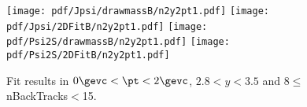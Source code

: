 \begin{figure}[H]
\begin{center}
\texttt{[image: pdf/Jpsi/drawmassB/n2y2pt1.pdf]}
\texttt{[image: pdf/Jpsi/2DFitB/n2y2pt1.pdf]}
\vspace*{-0.5cm}
\texttt{[image: pdf/Psi2S/drawmassB/n2y2pt1.pdf]}
\texttt{[image: pdf/Psi2S/2DFitB/n2y2pt1.pdf]}
\vspace*{-0.5cm}
\end{center}
\caption{Fit results in $0\gevc<\pt<2\gevc$, $2.8<y<3.5$ and 8$\leq$nBackTracks$<$15.}
\label{Fitn2y2pt1}
\end{figure}
